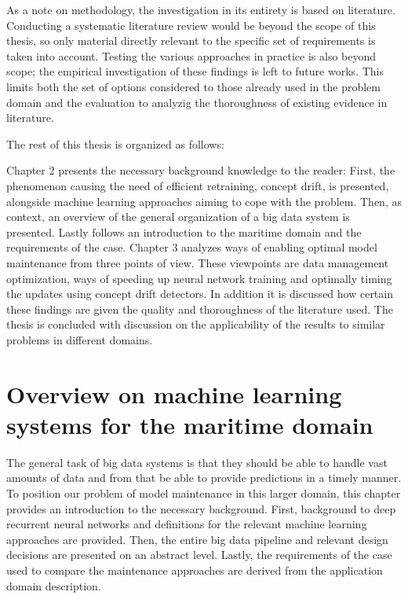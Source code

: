 As a note on methodology, the investigation in its entirety is based on literature. Conducting a systematic literature review would be beyond the scope of this thesis, so only material directly relevant to the specific set of requirements is taken into account. Testing the various approaches in practice is also beyond scope; the empirical investigation of these findings is left to future works. This limits both the set of options considered to those already used in the problem domain and the evaluation to analyzig the thoroughness of existing evidence in literature.


The rest of this thesis is organized as follows:

Chapter 2 presents the necessary background knowledge to the reader: First, the phenomenon causing the need of efficient retraining, concept drift, is presented, alongside machine learning approaches aiming to cope with the problem. Then, as context, an overview of the general organization of a big data system is presented. Lastly follows an introduction to the maritime domain and the requirements of the case. Chapter 3 analyzes ways of enabling optimal model maintenance from three points of view. These viewpoints are data management optimization,  ways of speeding up neural network training and optimally timing the updates using concept drift detectors. In addition it is discussed how certain these findings are given the quality and thoroughness of the literature used. The thesis is concluded with discussion on the applicability of the results to similar problems in different domains.

\chapter[Overview on machine learning systems for the maritime domain]{Overview on machine learning\\ systems for the maritime domain}


The general task of big data systems is that they should be able to handle vast amounts of data and from that be able to provide predictions in a timely manner. To position our problem of model maintenance in this larger domain, this chapter provides an introduction to the necessary background. First, background to deep recurrent neural networks and definitions for the relevant machine learning approaches are provided. Then, the entire big data pipeline and relevant design decisions are presented on an abstract level. Lastly, the requirements of the case used to compare the maintenance approaches are derived from the application domain description.

